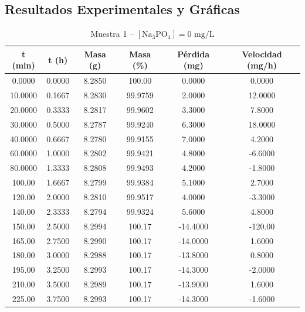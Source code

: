 \documentclass[11pt,a4paper]{article}
\begin{document}
\subsection{Resultados Experimentales y Gráficas}
\begin{table}[H]
\centering
\caption{Muestra 1 -- $[\text{Na}_3\text{PO}_4] = 0\text{ mg/L}$}
\label{tab:3_4_c0_m1}
\begin{tabular}{cccccc}
\toprule
t (min) & t (h) & Masa (g) & Masa (\%) & Pérdida (mg) & Velocidad (mg/h) \\
\midrule
0.0000 & 0.0000 & 8.2850 & 100.00 & 0.0000 & 0.0000 \\
10.0000 & 0.1667 & 8.2830 & 99.9759 & 2.0000 & 12.0000 \\
20.0000 & 0.3333 & 8.2817 & 99.9602 & 3.3000 & 7.8000 \\
30.0000 & 0.5000 & 8.2787 & 99.9240 & 6.3000 & 18.0000 \\
40.0000 & 0.6667 & 8.2780 & 99.9155 & 7.0000 & 4.2000 \\
60.0000 & 1.0000 & 8.2802 & 99.9421 & 4.8000 & -6.6000 \\
80.0000 & 1.3333 & 8.2808 & 99.9493 & 4.2000 & -1.8000 \\
100.00 & 1.6667 & 8.2799 & 99.9384 & 5.1000 & 2.7000 \\
120.00 & 2.0000 & 8.2810 & 99.9517 & 4.0000 & -3.3000 \\
140.00 & 2.3333 & 8.2794 & 99.9324 & 5.6000 & 4.8000 \\
150.00 & 2.5000 & 8.2994 & 100.17 & -14.4000 & -120.00 \\
165.00 & 2.7500 & 8.2990 & 100.17 & -14.0000 & 1.6000 \\
180.00 & 3.0000 & 8.2988 & 100.17 & -13.8000 & 0.8000 \\
195.00 & 3.2500 & 8.2993 & 100.17 & -14.3000 & -2.0000 \\
210.00 & 3.5000 & 8.2989 & 100.17 & -13.9000 & 1.6000 \\
225.00 & 3.7500 & 8.2993 & 100.17 & -14.3000 & -1.6000 \\
\bottomrule
\end{tabular}
\end{table}
\end{document}

